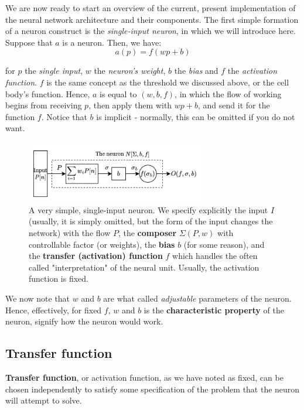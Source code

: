 We are now ready to start an overview of the current, present implementation of the neural network architecture and their components. The first simple formation of a neuron construct is the \textit{single-input neuron}, in which we will introduce here. Suppose that $a$ is a neuron. Then, we have: $$a(p)=f(wp+b)$$

for $p$ the \textit{single input}, $w$ the \textit{neuron's weight}, $b$ the \textit{bias} and $f$ the \textit{activation function}. $f$ is the same concept as the threshold we discussed above, or the cell body's function. Hence, $a$ is equal to $(w,b,f)$, in which the flow of working begins from receiving $p$, then apply them with $wp+b$, and send it for the function $f$. Notice that $b$ is implicit - normally, this can be omitted if you do not want. 
\begin{figure}[h!]
    \centering
    \includegraphics[width=0.7\textwidth]{img/brainneuron2.png}
    \caption{A very simple, single-input neuron. We specify explicitly the input $I$ (usually, it is simply omitted, but the form of the input changes the network) with the flow $P$, the \textbf{composer} $\Sigma(P, w)$ with controllable factor (or weights), the \textbf{bias} $b$ (for some reason), and the \textbf{transfer (activation) function} $f$ which handles the often called "interpretation" of the neural unit. Usually, the activation function is fixed.}
\end{figure}
We now note that $w$ and $b$ are what called \textit{adjustable} parameters of the neuron. Hence, effectively, for fixed $f$, $w$ and $b$ is the \textbf{characteristic property} of the neuron, signify how the neuron would work. 

\subsection{Transfer function}
\textbf{Transfer function}, or activation function, as we have noted as fixed, can be chosen independently to satisfy some specification of the problem that the neuron will attempt to solve. 

